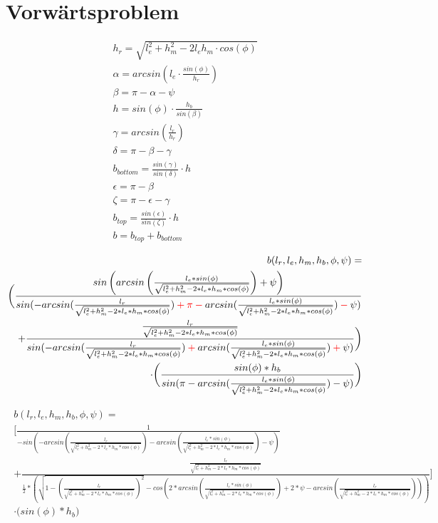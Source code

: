 \documentclass[12pt,a4paper, landscape]{article}
\author{Vera Loeser}
\begin{document}
	\section{Vorw\"artsproblem}

\begin{align*}
h_r = \sqrt{l_e^2 + h_m^2 - 2l_eh_m\cdot cos(\phi)}\\
\alpha =arcsin\left(l_e \cdot \frac{sin(\phi)}{h_r}\right)\\
\beta = \pi - \alpha - \psi\\
h = sin(\phi) \cdot \frac{h_b}{sin(\beta)}\\
\gamma = arcsin(\frac{l_r}{h_r})\\
\delta = \pi - \beta - \gamma\\
b_{bottom} = \frac{sin(\gamma)}{sin(\delta)}\cdot h\\
\epsilon = \pi - \beta\\
\zeta = \pi - \epsilon - \gamma\\
b_{top} = \frac{sin(\epsilon)}{sin(\zeta)}\cdot h\\
b = b_{top} + b_{bottom}
\end{align*}

\begin{align*}
\begin{split}
b (l_r, l_e, h_m, h_b, \phi, \psi) =\\ \bigg(\frac{sin\left(arcsin\left(\frac{l_e*sin(\phi)}{\sqrt{l_e ^2 + h_m^2 - 2*l_e*h_m * cos(\phi)}}\right)+\psi\right) }{sin(-arcsin(\frac{l_r}{\sqrt{l_e ^2 + h_m^2 - 2*l_e*h_m * cos(\phi)}})\color{red} + \pi - \color{black} arcsin(\frac{l_e * sin(\phi)}{\sqrt{l_e ^2 + h_m^2 - 2*l_e*h_m * cos(\phi)}}) \color{red} - \color{black} \psi)}\\ 
+ \frac{\frac{l_r}{\sqrt{l_e ^2 + h_m^2 - 2*l_e*h_m * cos(\phi)}}}{sin(-arcsin(\frac{l_r}{\sqrt{l_e ^2 + h_m^2 - 2*l_e*h_m * cos(\phi)}}) \color{red}+\color{black} arcsin(\frac{l_e * sin(\phi)}{\sqrt{l_e ^2 + h_m^2 - 2*l_e*h_m * cos(\phi)}}) \color{red} + \color{black} \psi)}\bigg)\\
\cdot\bigg(\frac{sin(\phi) * h_b}{sin(\pi - arcsin(\frac{l_e * sin(\phi)}{\sqrt{l_e ^2 + h_m^2 - 2*l_e*h_m * cos(\phi)}}) - \psi)}\bigg)
\end{split}
\end{align*}

\begin{align*}
	\begin{split}
		b (l_r, l_e, h_m, h_b, \phi, \psi) =\\ 
		\bigg[\frac{1}{-sin(-arcsin(\frac{l_r}{\sqrt{l_e ^2 + h_m^2 - 2*l_e*h_m * cos(\phi)}}) - arcsin(\frac{l_e * sin(\phi)}{\sqrt{l_e ^2 + h_m^2 - 2*l_e*h_m * cos(\phi)}}) - \psi)}\\ 
		+ \frac{\frac{l_r}{\sqrt{l_e ^2 + h_m^2 - 2*l_e*h_m * cos(\phi)}}}{\frac{1}{2} * \left( \sqrt{1- \left(\frac{l_r}{\sqrt{l_e ^2 + h_m^2 - 2*l_e*h_m * cos(\phi)}}\right)^2} - cos(2*arcsin(\frac{l_e * sin(\phi)}{\sqrt{l_e ^2 + h_m^2 - 2*l_e*h_m * cos(\phi)}}) + 2* \psi - arcsin(\frac{l_r}{\sqrt{l_e ^2 + h_m^2 - 2*l_e*h_m * cos(\phi)}})) \right)}\bigg]\\
		\cdot\bigg(sin(\phi) * h_b\bigg)
	\end{split}
\end{align*}
\end{document}
